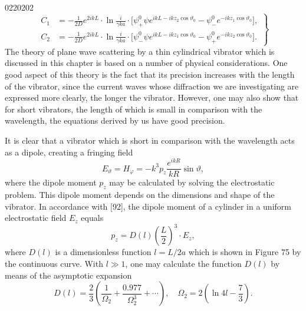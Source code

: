 \begin{scanpage}{0220}{202}
\[\left.\begin{aligned}
C_1&=-\frac1{2D}e^{2ikL}\cdot\ln\frac{i}{\gamma ka}\cdot\bigl[\psi_+^0\psi e^{ikL-ikz_2\cos\vartheta_0}-\psi_-^0 e^{-ikz_1\cos\vartheta_0}\bigr],\\
C_2&=-\frac1{2D}e^{2ikL}\cdot\ln\frac{i}{\gamma ka}\cdot\bigl[\psi_-^0\psi e^{ikL-ikz_1\cos\vartheta_0}-\psi_+^0 e^{-ikz_2\cos\vartheta_0}\bigr].
\end{aligned}\right\}\tag{32.14}\]
The theory of plane wave scattering by a thin cylindrical vibrator which is discussed in this chapter is based on a number of physical considerations. One good aspect of this theory is the fact that its precision increases with the length of the vibrator, since the current waves whose diffraction we are investigating are expressed more clearly, the longer the vibrator. However, one may also show that for short vibrators, the length of which is small in comparison with the wavelength, the equations derived by us have good precision.

It is clear that a vibrator which is short in comparison with the wavelength acts as a dipole, creating a fringing field
\[E_\vartheta=H_\varphi=-k^3p_z\frac{e^{ikR}}{kR}\sin\vartheta,\tag{33.01}\]
where the dipole moment $p_z$ may be calculated by solving the electrostatic problem. This dipole moment depends on the dimensions and shape of the vibrator. In accordance with [92], the dipole moment of a cylinder in a uniform electrostatic field $E_z$ equals
\[p_z=D(l)\left(\frac L2\right)^3\cdot E_z,\tag{33.02}\]
where $D(l)$ is a dimensionless function $l=L/2a$ which is shown in Figure 75 by the continuous curve. With $l\gg1$, one may calculate the function $D(l)$ by means of the asymptotic expansion
\[D(l)=\frac23\left(\frac1{\Omega_2}+\frac{0.977}{\Omega_2^3}+\cdots\right),\quad\Omega_2=2\left(\ln4l-\frac73\right).\tag{33.03}\]
\end{scanpage}
